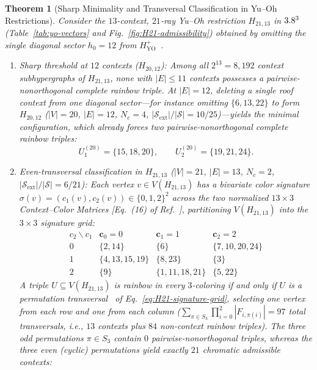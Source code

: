 \documentclass[aps,pra,reprint,superscriptaddress,longbibliography,nofootinbib,floatfix,10pt]{revtex4-2}
\newtheorem{theorem}{Theorem}
\theoremstyle{definition}\newtheorem{definition}[theorem]{Definition}
\theoremstyle{remark}\newtheorem{remark}[theorem]{Remark}
\newcommand{\Sc}{\mathcal S}\newcommand{\Cc}{\mathcal C}\newcommand{\Wc}{\mathcal W}
\newcommand{\YO}{\mathrm{YO}}\newcommand{\ip}[2]{\langle #1,#2\rangle}
\begin{document}
\begin{theorem}[Sharp Minimality and Transversal Classification in Yu--Oh Restrictions]\label{thm:H21-complete}
Consider the $13$-context, $21$-ray Yu--Oh restriction $H_{21,13}$ in $3.8^3$ (Table~\ref{tab:yo-vectors} and Fig.~\ref{fig:H21-admissibility}) obtained by omitting the single diagonal sector $h_0=12$ from $H_{\YO}^+$~\cite{svozil2026contexts,2026-latin-context-matrix}.
\begin{enumerate}
\item \emph{Sharp threshold at $12$ contexts ($H_{20,12}$):} Among all $2^{13}=8{,}192$ context subhypergraphs of $H_{21,13}$, none with $|E|\le 11$ contexts possesses a pairwise-nonorthogonal complete rainbow triple. At $|E|=12$, deleting a single roof context from one diagonal sector---for instance omitting $\{6,13,22\}$ to form $H_{20,12}$ ($|V|=20$, $|E|=12$, $N_c=4$, $|\Sc_{\mathrm{ext}}|/|\Sc|=10/25$)---yields the minimal configuration, which already forces two pairwise-nonorthogonal complete rainbow triples:
\begin{equation}\label{eq:H20-triples}
U_1^{(20)}=\{15,18,20\},\qquad U_2^{(20)}=\{19,21,24\}.
\end{equation}
\item \emph{Even-transversal classification in $H_{21,13}$ ($|V|=21$, $|E|=13$, $N_c=2$, $|\Sc_{\mathrm{ext}}|/|\Sc|=6/21$):} Each vertex $v\in V(H_{21,13})$ has a bivariate color signature $\sigma(v)=(c_1(v),c_2(v))\in\{0,1,2\}^2$ across the two normalized $13\times 3$ Context--Color Matrices [Eq.~(16) of Ref.~\cite{2026-latin-context-matrix}], partitioning $V(H_{21,13})$ into the $3\times 3$ signature grid:
\begin{equation}\label{eq:H21-signature-grid}
\begin{array}{c|ccc}
c_2\backslash c_1 & \mathbf{c}_0=0 & \mathbf{c}_1=1 & \mathbf{c}_2=2\\\hline
0 & \{2,14\} & \{6\} & \{7,10,20,24\}\\
1 & \{4,13,15,19\} & \{8,23\} & \{3\}\\
2 & \{9\} & \{1,11,18,21\} & \{5,22\}
\end{array}
\end{equation}
A triple $U\subseteq V(H_{21,13})$ is rainbow in every $3$-coloring if and only if $U$ is a \emph{permutation transversal}~\cite{wanless2011transversals} of Eq.~\eqref{eq:H21-signature-grid}, selecting one vertex from each row and one from each column ($\sum_{\pi\in S_3}\prod_{i=0}^2 |F_{i,\pi(i)}|=97$ total transversals, i.e., $13$ contexts plus $84$ non-context rainbow triples). The three odd permutations $\pi\in S_3$ contain $0$ pairwise-nonorthogonal triples, whereas the three even (cyclic) permutations yield \emph{exactly $21$ chromatic admissible contexts}:

\end{enumerate}
\end{theorem}
\end{document}
